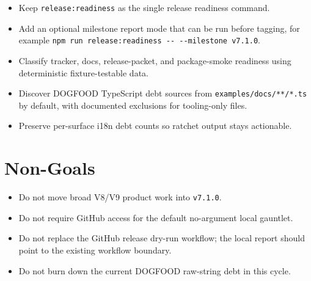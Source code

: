 \begin{itemize}
\tightlist
\item
  Keep \texttt{r\allowbreak{}e\allowbreak{}l\allowbreak{}e\allowbreak{}a\allowbreak{}s\allowbreak{}e\allowbreak{}:\allowbreak{}r\allowbreak{}e\allowbreak{}a\allowbreak{}d\allowbreak{}i\allowbreak{}n\allowbreak{}e\allowbreak{}s\allowbreak{}s} as the single release readiness command.
\item
  Add an optional milestone report mode that can be run before tagging, for example \texttt{n\allowbreak{}p\allowbreak{}m\allowbreak{} \allowbreak{}r\allowbreak{}u\allowbreak{}n\allowbreak{} \allowbreak{}r\allowbreak{}e\allowbreak{}l\allowbreak{}e\allowbreak{}a\allowbreak{}s\allowbreak{}e\allowbreak{}:\allowbreak{}r\allowbreak{}e\allowbreak{}a\allowbreak{}d\allowbreak{}i\allowbreak{}n\allowbreak{}e\allowbreak{}s\allowbreak{}s\allowbreak{} \allowbreak{}-\allowbreak{}-\allowbreak{} \allowbreak{}-\allowbreak{}-\allowbreak{}m\allowbreak{}i\allowbreak{}l\allowbreak{}e\allowbreak{}s\allowbreak{}t\allowbreak{}o\allowbreak{}n\allowbreak{}e\allowbreak{} \allowbreak{}v\allowbreak{}7\allowbreak{}.\allowbreak{}1\allowbreak{}.\allowbreak{}0}.
\item
  Classify tracker, docs, release-packet, and package-smoke readiness using deterministic fixture-testable data.
\item
  Discover DOGFOOD TypeScript debt sources from \texttt{e\allowbreak{}x\allowbreak{}a\allowbreak{}m\allowbreak{}p\allowbreak{}l\allowbreak{}e\allowbreak{}s\allowbreak{}/\allowbreak{}d\allowbreak{}o\allowbreak{}c\allowbreak{}s\allowbreak{}/\allowbreak{}*\allowbreak{}*\allowbreak{}/\allowbreak{}*\allowbreak{}.\allowbreak{}t\allowbreak{}s} by default, with documented exclusions for tooling-only files.
\item
  Preserve per-surface i18n debt counts so ratchet output stays actionable.
\end{itemize}

\section{Non-Goals}\label{record-214-non-goals}

\begin{itemize}
\tightlist
\item
  Do not move broad V8/V9 product work into \texttt{v\allowbreak{}7\allowbreak{}.\allowbreak{}1\allowbreak{}.\allowbreak{}0}.
\item
  Do not require GitHub access for the default no-argument local gauntlet.
\item
  Do not replace the GitHub release dry-run workflow; the local report should point to the existing workflow boundary.
\item
  Do not burn down the current DOGFOOD raw-string debt in this cycle.
\end{itemize}


